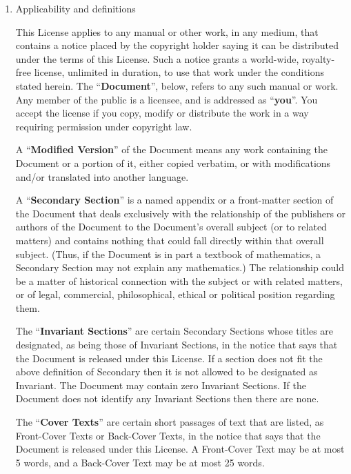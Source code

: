 \begin{enumerate}

\item Applicability and definitions


This License applies to any manual or other work, in any medium, that
contains a notice placed by the copyright holder saying it can be
distributed under the terms of this License.  Such a notice grants a
world-wide, royalty-free license, unlimited in duration, to use that
work under the conditions stated herein.  The ``\textbf{Document}'', below,
refers to any such manual or work.  Any member of the public is a
licensee, and is addressed as ``\textbf{you}''.  You accept the license if you
copy, modify or distribute the work in a way requiring permission
under copyright law.

A ``\textbf{Modified Version}'' of the Document means any work containing the
Document or a portion of it, either copied verbatim, or with
modifications and/or translated into another language.

A ``\textbf{Secondary Section}'' is a named appendix or a front-matter section of
the Document that deals exclusively with the relationship of the
publishers or authors of the Document to the Document's overall subject
(or to related matters) and contains nothing that could fall directly
within that overall subject.  (Thus, if the Document is in part a
textbook of mathematics, a Secondary Section may not explain any
mathematics.)  The relationship could be a matter of historical
connection with the subject or with related matters, or of legal,
commercial, philosophical, ethical or political position regarding
them.

The ``\textbf{Invariant Sections}'' are certain Secondary Sections whose titles
are designated, as being those of Invariant Sections, in the notice
that says that the Document is released under this License.  If a
section does not fit the above definition of Secondary then it is not
allowed to be designated as Invariant.  The Document may contain zero
Invariant Sections.  If the Document does not identify any Invariant
Sections then there are none.

The ``\textbf{Cover Texts}'' are certain short passages of text that are listed,
as Front-Cover Texts or Back-Cover Texts, in the notice that says that
the Document is released under this License.  A Front-Cover Text may
be at most 5 words, and a Back-Cover Text may be at most 25 words.


\end{enumerate}
